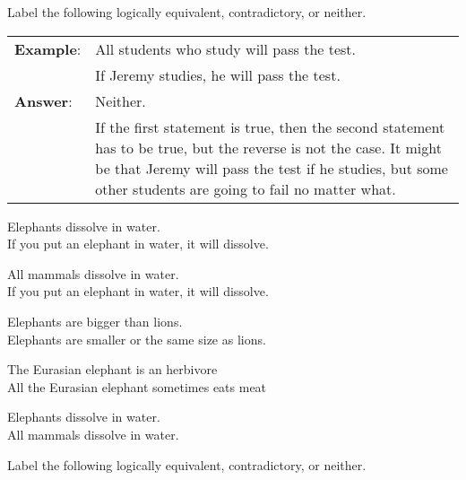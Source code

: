 \noindent \problempart Label the following logically equivalent, contradictory, or neither.

\begin{longtabu}{p{.1\linewidth}p{.9\linewidth}}
\textbf{Example}: &  All students who study will pass the test. \\
& If Jeremy studies, he will pass the test. \\
\textbf{Answer}: & Neither. \\
&If the first statement is true, then the second statement has to be true, but the reverse is not the case. It might be that Jeremy will pass the test if he studies, but some other students are going to fail no matter what.\\
\end{longtabu}


\begin{exercises}
\item Elephants dissolve in water.	\\
	If you put an elephant in water, it will dissolve.

\item All mammals dissolve in water.\\
	If you put an elephant in water, it will dissolve.

\item Elephants are bigger than lions. \\
Elephants are smaller or the same size as lions.

\item The Eurasian elephant is an herbivore \\
All the Eurasian elephant sometimes eats meat

\item Elephants dissolve in water. 	\\
	All mammals dissolve in water.

\end{exercises}


\noindent \problempart Label the following logically equivalent, contradictory, or neither.

